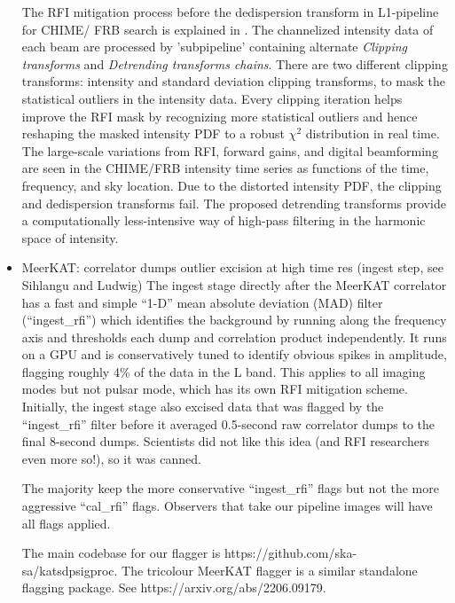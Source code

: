 \begin{itemize}
The RFI mitigation process before the dedispersion transform in L1-pipeline for CHIME/ FRB search is explained in \cite{chime_frb_rfi_2023}. The channelized intensity data of each beam are processed by 'subpipeline' containing alternate \textit{Clipping transforms} and \textit{Detrending transforms chains}. There are two different clipping transforms: intensity and standard deviation clipping transforms, to mask the statistical outliers in the intensity data. Every clipping iteration helps
improve the RFI mask by recognizing more statistical outliers and hence reshaping the masked intensity PDF to a robust $\chi^2$ distribution in real time. The large-scale variations from RFI, forward gains, and digital beamforming are seen in the CHIME/FRB intensity time series as functions of the time, frequency, and sky location. Due to the distorted intensity PDF, the clipping and dedispersion transforms fail. The proposed detrending transforms provide a computationally less-intensive way of high-pass filtering in the harmonic space of intensity.



\item MeerKAT: correlator dumps outlier excision at high time res (ingest step, see Sihlangu and Ludwig)
The ingest stage directly after the MeerKAT correlator has a fast and simple “1-D” mean absolute deviation (MAD) filter (“ingest\_rfi”) which identifies the background by running along the frequency axis and thresholds each dump and correlation product independently. It runs on a GPU and is conservatively tuned to identify obvious spikes in amplitude, flagging roughly 4\% of the data in the L band. This applies to all imaging modes but not pulsar mode, which has its own RFI mitigation scheme.
Initially, the ingest stage also excised data that was flagged by the “ingest\_rfi” filter before it averaged 0.5-second raw correlator dumps to the final 8-second dumps. Scientists did not like this idea (and RFI researchers even more so!), so it was canned.

The majority keep the more conservative “ingest\_rfi” flags but not the more aggressive “cal\_rfi” flags. Observers that take our pipeline images will have all flags applied.

The main codebase for our flagger is https://github.com/ska-sa/katsdpsigproc. The tricolour MeerKAT flagger is a similar standalone flagging package. See https://arxiv.org/abs/2206.09179.



\end{itemize}
